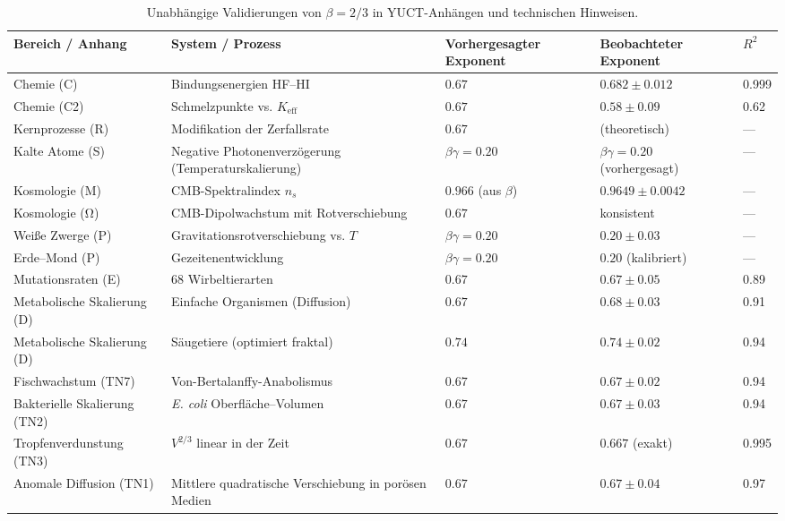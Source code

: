 \documentclass[11pt,a4paper]{article}
\newcommand{\betaf}{\beta}
\begin{document}
\begin{multicols}{2}
		\begin{table}[htbp]
			\centering
			\caption{Unabhängige Validierungen von \(\betaf = 2/3\) in YUCT-Anhängen und technischen Hinweisen.}
			\label{tab:full}
			\footnotesize
			\begin{tabular}{p{3.5cm}p{5.0cm}p{2.1cm}p{3.5cm}p{1.4cm}}
				\toprule
				\textbf{Bereich / Anhang} & \textbf{System / Prozess} & \textbf{Vorhergesagter Exponent} & \textbf{Beobachteter Exponent} & \(R^2\) \\
				\midrule
				Chemie (C) & Bindungsenergien HF–HI & \(0.67\) & \(0.682 \pm 0.012\) & 0.999 \\
				Chemie (C2) & Schmelzpunkte vs. \(K_{\mathrm{eff}}\) & \(0.67\) & \(0.58 \pm 0.09\) & 0.62 \\
				Kernprozesse (R) & Modifikation der Zerfallsrate & \(0.67\) & (theoretisch) & — \\
				Kalte Atome (S) & Negative Photonenverzögerung (Temperaturskalierung) & \(\beta\gamma = 0.20\) & \(\beta\gamma = 0.20\) (vorhergesagt) & — \\
				Kosmologie (M) & CMB-Spektralindex \(n_s\) & \(0.966\) (aus \(\beta\)) & \(0.9649 \pm 0.0042\) & — \\
				Kosmologie (Ω) & CMB-Dipolwachstum mit Rotverschiebung & \(0.67\) & konsistent & — \\
				Weiße Zwerge (P) & Gravitationsrotverschiebung vs. \(T\) & \(\beta\gamma = 0.20\) & \(0.20 \pm 0.03\) & — \\
				Erde–Mond (P) & Gezeitenentwicklung & \(\beta\gamma = 0.20\) & \(0.20\) (kalibriert) & — \\
				Mutationsraten (E) & 68 Wirbeltierarten & \(0.67\) & \(0.67 \pm 0.05\) & 0.89 \\
				Metabolische Skalierung (D) & Einfache Organismen (Diffusion) & \(0.67\) & \(0.68 \pm 0.03\) & 0.91 \\
				Metabolische Skalierung (D) & Säugetiere (optimiert fraktal) & \(0.74\) & \(0.74 \pm 0.02\) & 0.94 \\
				Fischwachstum (TN7) & Von-Bertalanffy-Anabolismus & \(0.67\) & \(0.67 \pm 0.02\) & 0.94 \\
				Bakterielle Skalierung (TN2) & \emph{E. coli} Oberfläche–Volumen & \(0.67\) & \(0.67 \pm 0.03\) & 0.94 \\
				Tropfenverdunstung (TN3) & \(V^{2/3}\) linear in der Zeit & \(0.67\) & \(0.667\) (exakt) & 0.995 \\
				Anomale Diffusion (TN1) & Mittlere quadratische Verschiebung in porösen Medien & \(0.67\) & \(0.67 \pm 0.04\) & 0.97 \\

\end{tabular}
\end{table}
\end{multicols}
\end{document}

